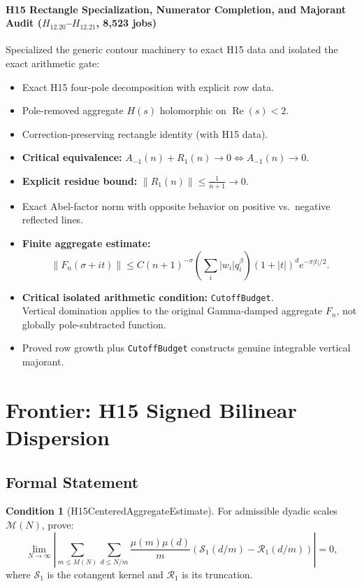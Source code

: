 \documentclass[11pt,a4paper]{article}
\theoremstyle{plain}
\theoremstyle{definition}
\newtheorem{condition}[theorem]{Condition}
\theoremstyle{remark}
\DeclareMathOperator{\RePart}{Re}
\renewcommand{\Re}{\RePart}
\begin{document}
\paragraph{H15 Rectangle Specialization, Numerator Completion, and Majorant Audit ($H_{12.20}$--$H_{12.21}$, 8,523 jobs)}

Specialized the generic contour machinery to exact H15 data and isolated the exact arithmetic gate:
\begin{itemize}[leftmargin=2em]
  \item Exact H15 four-pole decomposition with explicit row data.
  \item Pole-removed aggregate $H(s)$ holomorphic on $\Re(s) < 2$.
  \item Correction-preserving rectangle identity (with H15 data).
  \item \textbf{Critical equivalence:} $A_{-1}(n) + R_1(n) \to 0 \iff A_{-1}(n) \to 0$.
  \item \textbf{Explicit residue bound:} $\|R_1(n)\| \le \frac{1}{n+1} \to 0$.
  \item Exact Abel-factor norm with opposite behavior on positive vs.\ negative reflected lines.
  \item \textbf{Finite aggregate estimate:}
  \[
    \|F_n(\sigma+it)\| \le C(n+1)^{-\sigma} \left(\sum_i |w_i|q_i^\beta\right) (1+|t|)^d e^{-\pi|t|/2}.
  \]
  \item \textbf{Critical isolated arithmetic condition:} \texttt{CutoffBudget}. \\
    Vertical domination applies to the original Gamma-damped aggregate $F_n$, not globally pole-subtracted function.
  \item Proved row growth plus \texttt{CutoffBudget} constructs genuine integrable vertical majorant.
\end{itemize}

\section{Frontier: H15 Signed Bilinear Dispersion}
\label{sec:frontier}

\subsection{Formal Statement}

\begin{condition}[H15CenteredAggregateEstimate]
For admissible dyadic scales $\mathcal{M}(N)$, prove:
\[
\lim_{N \to \infty} \left| \sum_{m \le M(N)} \sum_{d \le N/m} \frac{\mu(m)\mu(d)}{m} \left( \mathcal{S}_1(d/m) - \mathcal{R}_1(d/m) \right) \right| = 0,
\]
where $\mathcal{S}_1$ is the cotangent kernel and $\mathcal{R}_1$ is its truncation.
\end{condition}
\end{document}
